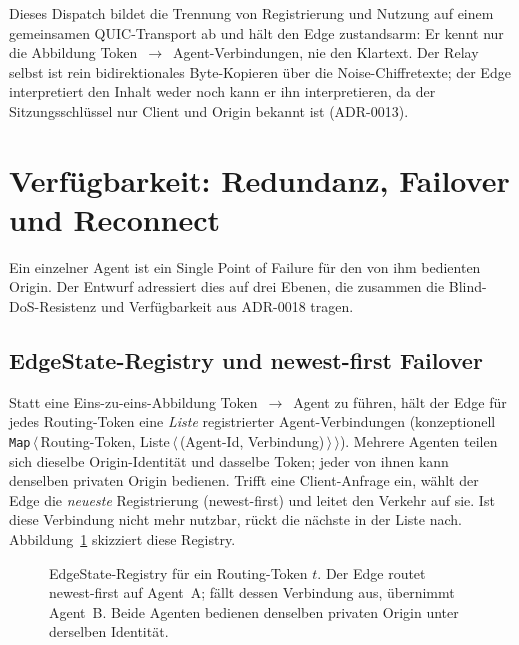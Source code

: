Dieses Dispatch bildet die Trennung von Registrierung und Nutzung auf einem
gemeinsamen QUIC-Transport ab und hält den Edge zustandsarm: Er kennt nur die
Abbildung Token~$\rightarrow$~Agent-Verbindungen, nie den Klartext. Der Relay
selbst ist rein bidirektionales Byte-Kopieren über die Noise-Chiffretexte; der
Edge interpretiert den Inhalt weder noch kann er ihn interpretieren, da der
Sitzungsschlüssel nur Client und Origin bekannt ist (ADR-0013).

\section{Verfügbarkeit: Redundanz, Failover und Reconnect}
\label{sec:resilienz}

Ein einzelner Agent ist ein Single Point of Failure für den von ihm bedienten
Origin. Der Entwurf adressiert dies auf drei Ebenen, die zusammen die
Blind-DoS-Resistenz und Verfügbarkeit aus ADR-0018 tragen.

\subsection{EdgeState-Registry und newest-first Failover}
\label{subsec:registry}

Statt eine Eins-zu-eins-Abbildung Token~$\rightarrow$~Agent zu führen, hält der
Edge für jedes Routing-Token eine \emph{Liste} registrierter Agent-Verbindungen
(konzeptionell \texttt{Map}\,$\langle$\,Routing-Token,
Liste\,$\langle$\,(Agent-Id, Verbindung)\,$\rangle$\,$\rangle$). Mehrere Agenten
teilen sich dieselbe Origin-Identität und dasselbe Token; jeder von ihnen kann
denselben privaten Origin bedienen. Trifft eine Client-Anfrage ein, wählt der
Edge die \emph{neueste} Registrierung (newest-first) und leitet den Verkehr auf
sie. Ist diese Verbindung nicht mehr nutzbar, rückt die nächste in der Liste
nach. Abbildung~\ref{fig:failover} skizziert diese Registry.

\begin{figure}[t]
  \centering
  \caption{EdgeState-Registry für ein Routing-Token $t$. Der Edge routet
    newest-first auf Agent~A; fällt dessen Verbindung aus, übernimmt Agent~B.
    Beide Agenten bedienen denselben privaten Origin unter derselben Identität.}
  \label{fig:failover}
\end{figure}

